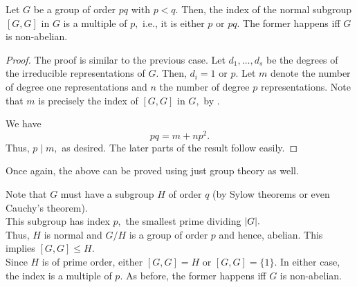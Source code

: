 \begin{cor}
	Let $G$ be a group of order $pq$ with $p < q.$ Then, the index of the normal subgroup $[G, G]$ in $G$ is a multiple of $p,$ i.e., it is either $p$ or $pq.$ The former happens iff $G$ is non-abelian.
\end{cor}
\begin{proof} 
	The proof is similar to the previous case. Let $d_1, \ldots, d_s$ be the degrees of the irreducible representations of $G.$ Then, $d_i = 1$ or $p.$ Let $m$ denote the number of degree one representations and $n$ the number of degree $p$ representations. Note that $m$ is precisely the index of $[G, G]$ in $G,$ by .

	We have
	\begin{equation*} 
		pq = m + np^2.
	\end{equation*}
	Thus, $p \mid m,$ as desired. The later parts of the result follow easily.
\end{proof}

\begin{rem}
	Once again, the above can be proved using just group theory as well. 

	Note that $G$ must have a subgroup $H$ of order $q$ (by Sylow theorems or even Cauchy's theorem). \\
	This subgroup has index $p,$ the smallest prime dividing ${\left\lvert G \right\lvert}.$ \\
	Thus, $H$ is normal and $G/H$ is a group of order $p$ and hence, abelian. This implies $[G, G] \le H.$ \\
	Since $H$ is of prime order, either $[G, G] = H$ or $[G, G] = \{1\}.$ In either case, the index is a multiple of $p.$ As before, the former happens iff $G$ is non-abelian.
\end{rem}
